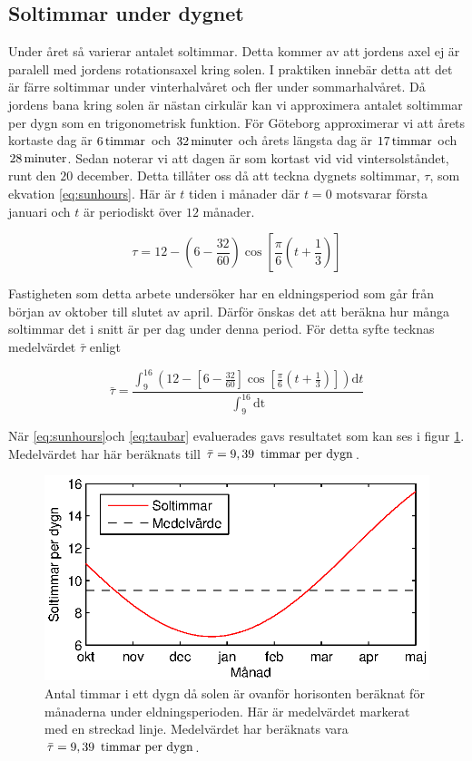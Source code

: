 \subsection{Soltimmar under dygnet}
\label{subsec:sunhours}
Under året så varierar antalet soltimmar. Detta kommer av att jordens axel ej är paralell
med jordens rotationsaxel kring solen. I praktiken innebär detta att det är färre soltimmar
under vinterhalvåret och fler under sommarhalvåret. Då jordens bana kring solen är nästan
cirkulär kan vi approximera antalet soltimmar per dygn som en trigonometrisk funktion.
För Göteborg approximerar vi att årets kortaste dag är $\unit[6]{ timmar}$ och $\unit[32]{minuter}$ och årets längsta
dag är $\unit[17]{ timmar}$ och $\unit[28]{ minuter}$. \cite{sunup} Sedan noterar vi att dagen är som kortast vid vid vintersolståndet, runt den $20$
december.
Detta tillåter oss då att teckna dygnets soltimmar, $\tau$, som ekvation \eqref{eq:sunhours}. Här
är $t$ tiden i månader där $t=0$ motsvarar första januari och $t$ är periodiskt över $12$ månader.

\begin{equation}
\label{eq:sunhours}
\tau = 12 - \left(6-\frac{32}{60}\right)\cos\left[\frac{\pi}{6}\left(t+\frac{1}{3}\right)\right]
\end{equation}

Fastigheten som detta arbete undersöker har en eldningsperiod som går från början av oktober till slutet av april. Därför önskas det att beräkna hur många soltimmar det i snitt är per dag under denna period. För detta syfte tecknas medelvärdet $\bar{\tau}$ enligt

\begin{equation}
\label{eq:taubar}
\bar{\tau}= \frac{ \int^{16}_9 \left(12 - \left[6-\frac{32}{60}\right]\cos\left[\frac{\pi}{6}\left(t+
\frac{1}{3}\right)\right]\right)\mathrm{d}t}{\int^{16}_9 \mathrm{dt}}
\end{equation}

När \eqref{eq:sunhours}och \eqref{eq:taubar} evaluerades gavs 
resultatet som kan ses i figur \ref{fig:sunhours}.
Medelvärdet har här beräknats till $\bar{\tau}=\unit[9,39]{~timmar~per~dygn}$.
\begin{figure}
\centering
\includegraphics{images/sunhours.eps}
\caption{Antal timmar i ett dygn då solen är ovanför horisonten beräknat för månaderna under eldningsperioden.
Här är medelvärdet markerat med en streckad linje. Medelvärdet har beräknats vara
$\bar{\tau}=\unit[9,39]{~timmar~per~dygn}$.}
\label{fig:sunhours}
\end{figure}

